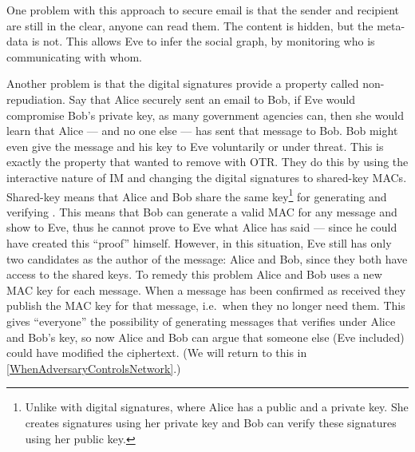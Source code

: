 
One problem with this approach to secure email is that the sender and recipient
are still in the clear, anyone can read them.
The content is hidden, but the meta-data is not.
This allows Eve to infer the social graph, by monitoring who is communicating 
with whom.

Another problem is that the digital signatures provide a property called 
non-repudiation.
Say that Alice securely sent an email to Bob, if Eve would compromise Bob's 
private key, as many government agencies can, then she would learn that Alice 
--- and no one else --- has sent that message to Bob.
Bob might even give the message and his key to Eve voluntarily or under threat.
This is exactly the property that \citeauthor{otr2004} wanted to remove with 
\ac{OTR}.
They do this by using the interactive nature of \ac{IM} and changing the 
digital signatures to shared-key \acp{MAC}.
Shared-key means that Alice and Bob share the same key\footnote{%
  Unlike with digital signatures, where Alice has a public and a private key.
  She creates signatures using her private key and Bob can verify these 
  signatures using her public key.
} for generating and verifying .
This means that Bob can generate a valid \ac{MAC} for any message and show to 
Eve, thus he cannot prove to Eve what Alice has said --- since he could have 
created this \enquote{proof} himself.
However, in this situation, Eve still has only two candidates as the author of 
the message: Alice and Bob, since they both have access to the shared keys.
To remedy this problem Alice and Bob uses a new \ac{MAC} key for each message.
When a message has been confirmed as received they publish the \ac{MAC} key for 
that message, i.e.\ when they no longer need them.
This gives \enquote{everyone} the possibility of generating messages that 
verifies under Alice and Bob's key, so now Alice and Bob can argue that someone 
else (Eve included) could have modified the ciphertext.
(We will return to this in \cref{WhenAdversaryControlsNetwork}.)

